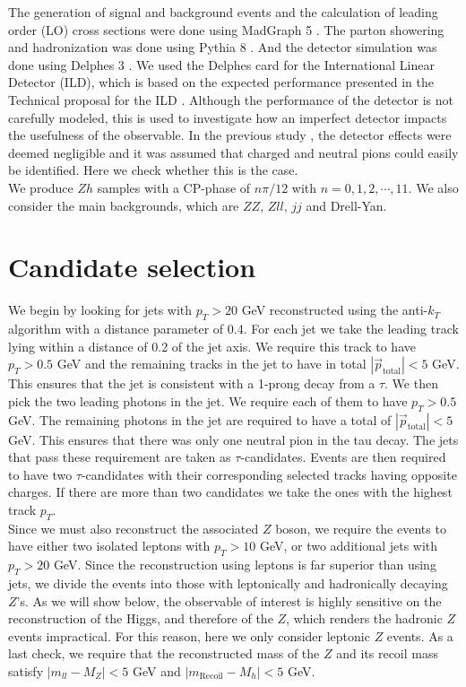 \documentclass[preprintnumbers,nofootinbib,noshowpacs,eqsecnum,prd,superscriptaddress,letterpaper]{revtex4}
\begin{document}
The generation of signal and background events and the calculation of leading order (LO) cross sections were done using MadGraph 5 \cite{madgraph}. The parton showering and hadronization was done using Pythia 8 \cite{pythia}. And the detector simulation was done using Delphes 3 \cite{delphes}. We used the Delphes card for the International Linear Detector (ILD), which is based on the expected performance presented in the Technical proposal for the ILD \cite{ilc}. Although the performance of the detector is not carefully modeled, this is used to investigate how an imperfect detector impacts the usefulness of the observable. In the previous study \cite{harnik}, the detector effects were deemed negligible and it was assumed that charged and neutral pions could easily be identified. Here we check whether this is the case.\\

We produce $Zh$ samples with a CP-phase of $n\pi/12$ with $n=0,1,2,\cdots,11$. We also consider the main backgrounds, which are $ZZ$, $Zll$, $jj$ and Drell-Yan.

\section{Candidate selection}
\label{sec:selection}

We begin by looking for jets with $p_T>20$ GeV reconstructed using the anti-$k_T$ algorithm \cite{cacciari} with a distance parameter of 0.4. For each jet we take the leading track lying within a distance of 0.2 of the jet axis. We require this track to have $p_T>0.5$ GeV and the remaining tracks in the jet to have in total $|\vec{p}_\text{total}|<5$ GeV. This ensures that the jet is consistent with a 1-prong decay from a $\tau$. We then pick the two leading photons in the jet. We require each of them to have $p_T>0.5$ GeV. The remaining photons in the jet are required to have a total of $|\vec{p}_\text{total}|<5$ GeV. This ensures that there was only one neutral pion in the tau decay. The jets that pass these requirement are taken as $\tau$-candidates. Events are then required to have two $\tau$-candidates with their corresponding selected tracks having opposite charges. If there are more than two candidates we take the ones with the highest track $p_T$.\\

Since we must also reconstruct the associated $Z$ boson, we require the events to have either two isolated leptons with $p_T>10$ GeV, or two additional jets with $p_T>20$ GeV. Since the reconstruction using leptons is far superior than using jets, we divide the events into those with leptonically and hadronically decaying $Z$'s. As we will show below, the observable of interest is highly sensitive on the reconstruction of the Higgs, and therefore of the $Z$, which renders the hadronic $Z$ events impractical. For this reason, here we only consider leptonic $Z$ events. As a last check, we require that the reconstructed mass of the $Z$ and its recoil mass satisfy $|m_{ll}-M_Z|<5$ GeV and $|m_\text{Recoil}-M_h|<5$ GeV.\\
\end{document}

